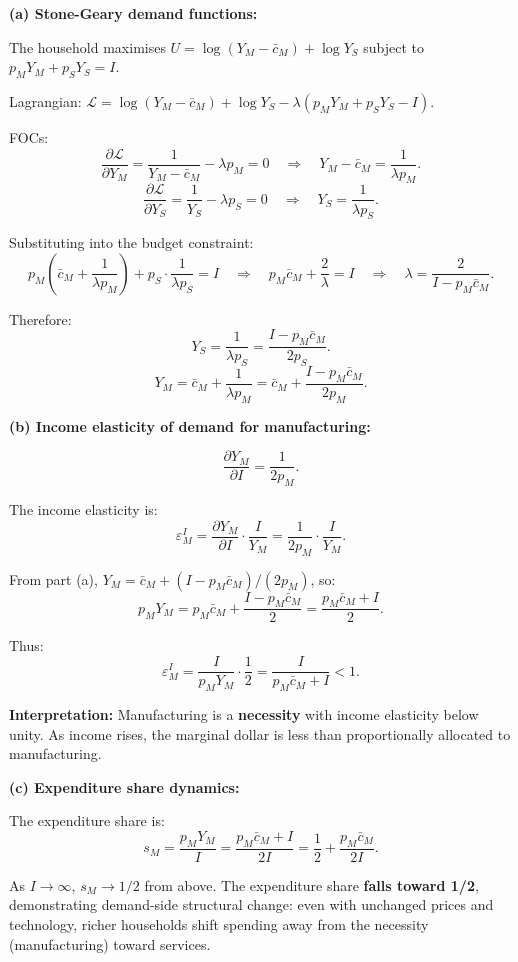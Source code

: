 \documentclass[a4paper,11pt]{article}
\begin{document}
\begin{answerbox}
\textbf{(a) Stone-Geary demand functions:}

The household maximises $U = \log(Y_M - \bar{c}_M) + \log Y_S$ subject to $p_M Y_M + p_S Y_S = I$.

Lagrangian: $\mathcal{L} = \log(Y_M - \bar{c}_M) + \log Y_S - \lambda(p_M Y_M + p_S Y_S - I)$.

FOCs:
\[
    \frac{\partial\mathcal{L}}{\partial Y_M} = \frac{1}{Y_M - \bar{c}_M} - \lambda p_M = 0 \quad\Longrightarrow\quad Y_M - \bar{c}_M = \frac{1}{\lambda p_M}.
\]
\[
    \frac{\partial\mathcal{L}}{\partial Y_S} = \frac{1}{Y_S} - \lambda p_S = 0 \quad\Longrightarrow\quad Y_S = \frac{1}{\lambda p_S}.
\]

Substituting into the budget constraint:
\[
    p_M\left(\bar{c}_M + \frac{1}{\lambda p_M}\right) + p_S \cdot \frac{1}{\lambda p_S} = I
    \quad\Longrightarrow\quad
    p_M\bar{c}_M + \frac{2}{\lambda} = I
    \quad\Longrightarrow\quad
    \lambda = \frac{2}{I - p_M\bar{c}_M}.
\]

Therefore:
\[
    Y_S = \frac{1}{\lambda p_S} = \boxed{\frac{I - p_M\bar{c}_M}{2p_S}.}
\]
\[
    Y_M = \bar{c}_M + \frac{1}{\lambda p_M} = \boxed{\bar{c}_M + \frac{I - p_M\bar{c}_M}{2p_M}.}
\]

\textbf{(b) Income elasticity of demand for manufacturing:}

\[
    \frac{\partial Y_M}{\partial I} = \frac{1}{2p_M}.
\]

The income elasticity is:
\[
    \varepsilon_M^I = \frac{\partial Y_M}{\partial I}\cdot\frac{I}{Y_M}
    = \frac{1}{2p_M}\cdot\frac{I}{Y_M}.
\]

From part (a), $Y_M = \bar{c}_M + (I-p_M\bar{c}_M)/(2p_M)$, so:
\[
    p_M Y_M = p_M\bar{c}_M + \frac{I-p_M\bar{c}_M}{2}
    = \frac{p_M\bar{c}_M + I}{2}.
\]

Thus:
\[
    \varepsilon_M^I = \frac{I}{p_M Y_M} \cdot \frac{1}{2} = \frac{I}{p_M\bar{c}_M + I} < 1.
\]

\textbf{Interpretation:} Manufacturing is a \textbf{necessity} with income elasticity below unity. As income rises, the marginal dollar is less than proportionally allocated to manufacturing.

\textbf{(c) Expenditure share dynamics:}

The expenditure share is:
\[
    s_M = \frac{p_M Y_M}{I} = \frac{p_M\bar{c}_M + I}{2I} = \frac{1}{2} + \frac{p_M\bar{c}_M}{2I}.
\]

As $I \to \infty$, $s_M \to 1/2$ from above. The expenditure share \textbf{falls toward 1/2}, demonstrating demand-side structural change: even with unchanged prices and technology, richer households shift spending away from the necessity (manufacturing) toward services.
\end{answerbox}
\end{document}
